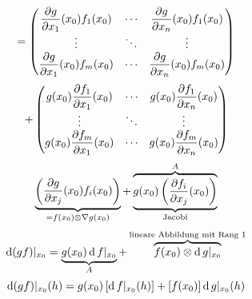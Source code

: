   \[ = \begin{pmatrix}
    \dfrac{\partial g}{\partial x_1}(x_0)f_1(x_0) & \cdots & \dfrac{\partial g}{\partial x_n}(x_0)f_1(x_0) \\
    \vdots & \ddots & \vdots \\
    \dfrac{\partial g}{\partial x_1}(x_0)f_m(x_0) & \cdots & \dfrac{\partial g}{\partial x_n}(x_0)f_m(x_0) \\
  \end{pmatrix}\]
  \[+ \begin{pmatrix}
    g(x_0)\dfrac{\partial f_1}{\partial x_1}(x_0) & \cdots & g(x_0)\dfrac{\partial f_1}{\partial x_n}(x_0)\\
    \vdots & \ddots & \vdots \\
    g(x_0)\dfrac{\partial f_m}{\partial x_1}(x_0) & \cdots & g(x_0)\dfrac{\partial f_m}{\partial x_n}(x_0)\\
  \end{pmatrix} \]
  \[ \underbrace{\begin{pmatrix}
    \dfrac{\partial g}{\partial x_j}(x_0) f_i(x_0)
  \end{pmatrix}}_{ = f(x_0)\otimes \nabla g(x_0)} + \overbrace{\underbrace{g(x_0) \left( \dfrac{\partial f_i}{\partial x_j}(x_0) \right)}_{\text{Jacobi}}}^A\]
  \[\operatorname{d} (gf)|_{x_0}=\underbrace{g(x_0)\operatorname{d} f|_{x_0}}_A+\overbrace{f(x_0)\otimes \operatorname{d} g|_{x_0}}^{\text{lineare Abbildung mit Rang 1}}\]
  \[\operatorname{d} (gf)|_{x_0}(h)=g(x_0)\left[ \operatorname{d} f|_{x_0}(h) \right]+\left[ f(x_0) \right]\operatorname{d} g|_{x_0}(h)\]

